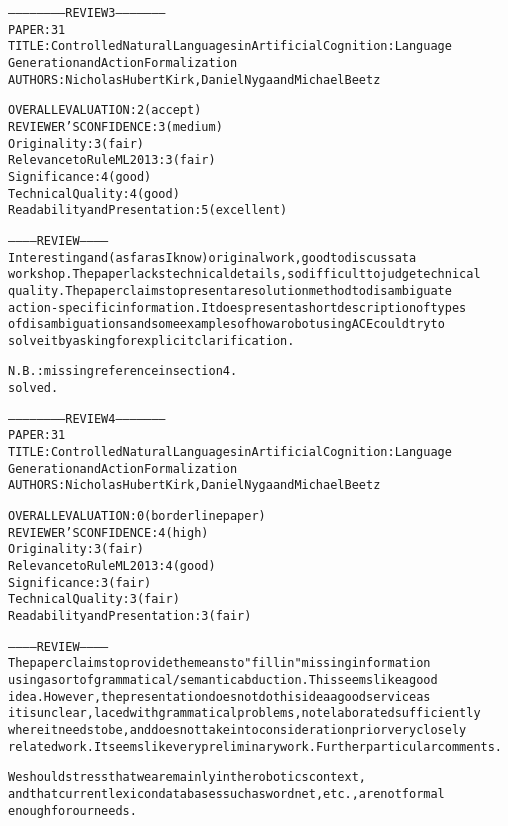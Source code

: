 \documentclass[oribibl]{llncs}
\newcommand{\comment}[1]{{\color{red} #1}}
\begin{document}
\begin{alltt}
----------------------- REVIEW 3 ---------------------
PAPER: 31
TITLE: Controlled Natural Languages in Artificial Cognition: Language 
Generation and Action Formalization
AUTHORS: Nicholas Hubert Kirk, Daniel Nyga and Michael Beetz

OVERALL EVALUATION: 2 (accept)
REVIEWER'S CONFIDENCE: 3 (medium)
Originality: 3 (fair)
Relevance to RuleML 2013: 3 (fair)
Significance: 4 (good)
Technical Quality: 4 (good)
Readability and Presentation: 5 (excellent)

----------- REVIEW -----------
Interesting and (as far as I know) original work, good to discuss at a 
workshop. The paper lacks technical details, so difficult to judge technical 
quality. The paper claims to present a resolution method to disambiguate 
action-specific information. It does present a short description of types 
of disambiguations and some examples of how a robot using ACE could try to 
solve it by asking for explicit clarification.

N.B.: missing reference in section 4.
\comment{solved.}

----------------------- REVIEW 4 ---------------------
PAPER: 31
TITLE: Controlled Natural Languages in Artificial Cognition: Language 
Generation and Action Formalization
AUTHORS: Nicholas Hubert Kirk, Daniel Nyga and Michael Beetz

OVERALL EVALUATION: 0 (borderline paper)
REVIEWER'S CONFIDENCE: 4 (high)
Originality: 3 (fair)
Relevance to RuleML 2013: 4 (good)
Significance: 3 (fair)
Technical Quality: 3 (fair)
Readability and Presentation: 3 (fair)

----------- REVIEW -----------
The paper claims to provide the means to "fill in" missing information 
using a sort of grammatical/semantic abduction.  This seems like a good 
idea.  However, the presentation does not do this idea a good service as 
it is unclear, laced with grammatical problems, not elaborated sufficiently 
where it needs to be, and does not take into consideration prior very closely
 related work.  It seems like very preliminary work.  Further particular comments.
 
 \comment{We should stress that we are mainly in the robotics context,
 and that current lexicon databases such as wordnet, etc., are not formal
 enough for our needs.}


\end{alltt}
\end{document}
